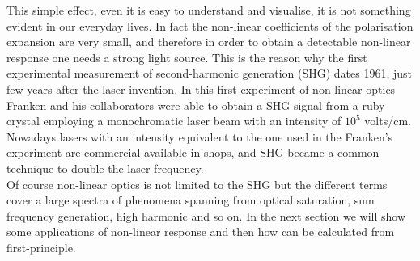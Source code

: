 This simple effect, even it is easy to understand and visualise, it is not something evident in our everyday lives. In fact the non-linear coefficients of the polarisation expansion are very small, and therefore in order to obtain a detectable non-linear response one needs a strong light source. This is the reason why the first experimental measurement of second-harmonic generation (SHG) dates 1961\cite{franken1961generation}, just few years after the laser invention.\cite{maiman1960stimulated} In this first experiment of non-linear optics Franken and his collaborators were able to obtain a SHG signal from a ruby crystal employing a monochromatic laser beam with an intensity of $10^5$ volts/cm.\\ %
Nowadays lasers with an intensity equivalent to the one used in the Franken's experiment are commercial available in shops, and SHG became a common technique to double the laser frequency.\\
Of course non-linear optics is not limited to the SHG but the different terms cover a large spectra of phenomena spanning from optical saturation, sum frequency generation, high harmonic and so on. In the next section we will show some applications of non-linear response and then how can be calculated from first-principle.
